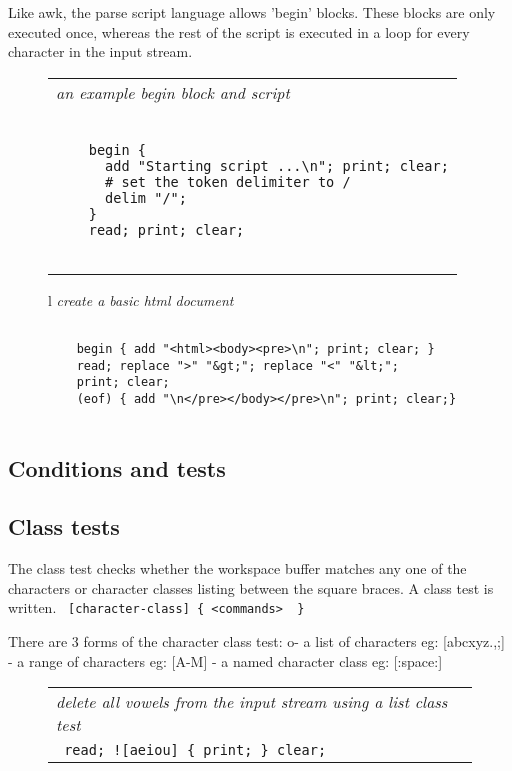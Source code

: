 \documentclass[a4paper,12pt]{article}
\begin{document}
  Like awk, the parse script language allows 'begin' blocks. These
  blocks are only executed once, whereas the rest of the script
  is executed in a loop for every character in the input stream.
 \begin{figure}
 \begin{tabular}{ l }
 \emph{ an example begin block and script } \\ 
 \begin{lstlisting}[breaklines] 

    begin {
      add "Starting script ...\n"; print; clear;
      # set the token delimiter to / 
      delim "/";  
    }
    read; print; clear;
  
 \end{lstlisting} 
 \end{tabular} 

 \end{figure}
 \begin{figure}
 \begin{tabular}{ l }
 \emph{ create a basic html document  } \\ 
 \begin{lstlisting}[breaklines] 

    begin { add "<html><body><pre>\n"; print; clear; } 
    read; replace ">" "&gt;"; replace "<" "&lt;"; 
    print; clear;
    (eof) { add "\n</pre></body></pre>\n"; print; clear;}
  
 \end{lstlisting} 
 \end{tabular} 

 \end{figure}


\subsection{Conditions and tests}

\subsection{Class tests}

  The class test checks whether the workspace buffer matches any one of the
  characters or character classes listing between the square braces. A class
  test is written. 
 \verb| [character-class] { <commands>  } |


  There are 3 forms of the character class test:
   o- a list of characters eg: [abcxyz.,;]
    - a range of characters eg: [A-M]
    - a named character class eg: [:space:]
 \begin{figure}
 \begin{tabular}{ l }
 \emph{ delete all vowels from the input stream using a list class test } \\ 
 \verb| read; ![aeiou] { print; } clear; |
 \end{tabular} 
 \end{figure}
\end{document}
